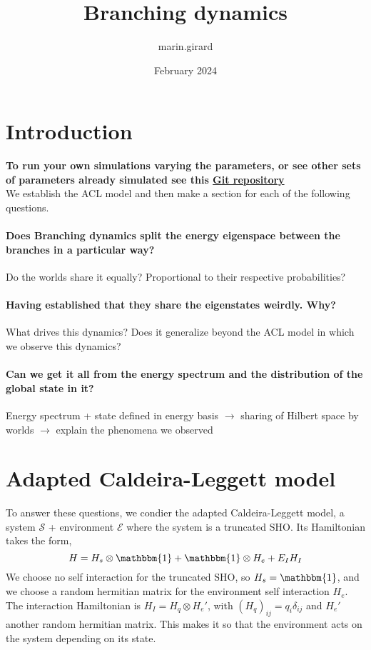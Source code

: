 \documentclass{article}
\title{Branching dynamics}
\author{marin.girard }
\date{February 2024}
\begin{document}
\maketitle

\section{Introduction}

\textbf{To run your own simulations varying the parameters, or see other sets of parameters already simulated see this
\href{http://github.com/MarinAndreGirard/Quantum_Branching}{Git repository}}\\
We establish the ACL model and then make a section for each of the following questions.

\paragraph{Does Branching dynamics split the energy eigenspace between the branches in a particular way?}
Do the worlds share it equally? Proportional to their respective probabilities?

\paragraph{Having established that they share the eigenstates weirdly. Why?}
What drives this dynamics? Does it generalize beyond the ACL model in which we observe this dynamics?

\paragraph{Can we get it all from the energy spectrum and the distribution of the global state in it?}

Energy spectrum + state defined in energy basis $\rightarrow$ sharing of Hilbert space by worlds $\rightarrow$ explain the phenomena we observed

\section{Adapted Caldeira-Leggett model}

To answer these questions, we condier the adapted Caldeira-Leggett model, a system $\mathcal{S}$ + environment $\mathcal{E}$ where the system is a truncated SHO. Its Hamiltonian takes the form,
\begin{equation}    
    H=H_s\otimes\mathbbm{1}+\mathbbm{1}\otimes H_e+E_IH_I
\end{equation}
We choose no self interaction for the truncated SHO, so $H_s=\mathbbm{1}$, and we choose a random hermitian matrix for the environment self interaction $H_e$. The interaction Hamiltonian is $H_I=H_q\otimes H_e'$, with $(H_q)_{ij}=q_i\delta_{ij}$ and $H_e'$ another random hermitian matrix. This makes it so that the environment acts on the system depending on its state. \\
\end{document}
